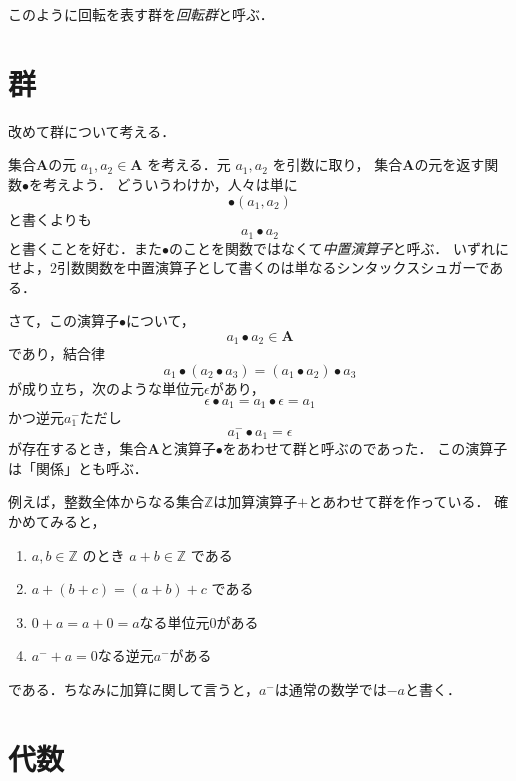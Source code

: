\documentclass{jsbook}
\newcommand{\keyword}[1]{\emph{#1}}
\newcommand{\bg}[1]{\mathbf{#1}}
\begin{document}
このように回転を表す群を\keyword{回転群}と呼ぶ．

\section{群}

改めて群について考える．

集合$\bg{A}$の元 $a_1,a_2\in\bg{A}$ を考える．元 $a_1,a_2$ を引数に取り，
集合$\bg{A}$の元を返す関数$\bullet$を考えよう．
どういうわけか，人々は単に
\begin{equation}
\bullet(a_1,a_2)
\end{equation}
と書くよりも
\begin{equation}
a_1\bullet a_2
\end{equation}
と書くことを好む．また$\bullet$のことを関数ではなくて\keyword{中置演算子}と呼ぶ．
いずれにせよ，2引数関数を中置演算子として書くのは単なるシンタックスシュガーである．

さて，この演算子$\bullet$について，
\begin{equation}
a_1\bullet a_2\in\bg{A}
\end{equation}
であり，結合律
\begin{equation}
a_1\bullet(a_2\bullet a_3)=(a_1\bullet a_2)\bullet a_3
\end{equation}
が成り立ち，次のような単位元$\epsilon$があり，
\begin{equation}
\epsilon\bullet a_1=a_1\bullet\epsilon=a_1
\end{equation}
かつ逆元$a_1^{-}$ただし
\begin{equation}
a_1^{-}\bullet a_1=\epsilon
\end{equation}
が存在するとき，集合$\bg{A}$と演算子$\bullet$をあわせて群と呼ぶのであった．
この演算子は「関係」とも呼ぶ．

例えば，整数全体からなる集合$\mathbb{Z}$は加算演算子$+$とあわせて群を作っている．
確かめてみると，
\begin{enumerate}
\item $a,b\in\mathbb{Z}$ のとき $a+b\in\mathbb{Z}$ である
\item $a+(b+c)=(a+b)+c$ である
\item $0+a=a+0=a$なる単位元$0$がある
\item $a^{-}+a=0$なる逆元$a^{-}$がある
\end{enumerate}
である．ちなみに加算に関して言うと，$a^{-}$は通常の数学では$-a$と書く．

\section{代数}
\end{document}
